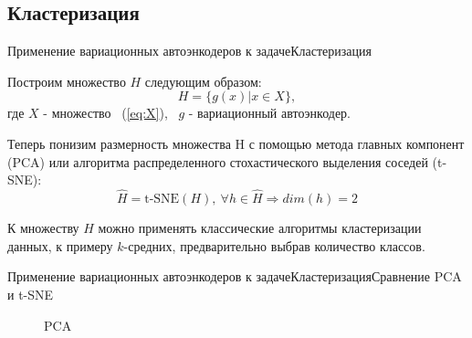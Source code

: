 \documentclass{beamer}
\begin{document}
\subsection{Кластеризация}

\begin{frame}{Применение вариационных автоэнкодеров к задаче}{Кластеризация}

Построим множество $H$ следующим образом:
\begin{equation}\label{eq:H}
H = \{g(x) | x \in X\},
\end{equation}
где $X$ - множество ~(\ref{eq:X}), ~$g$ - вариационный автоэнкодер. \par\medskip
Теперь понизим размерность множества H с помощью метода главных компонент (PCA) или алгоритма распределенного стохастического выделения соседей (t-SNE):
\begin{equation}\label{eq:hH}
\hat{H} = \text{t-SNE}(H), ~\forall h \in \hat{H} \Rightarrow dim(h) = 2
\end{equation}

К множеству $\hat{H}$ можно применять классические алгоритмы кластеризации данных, к примеру $k$-средних, предварительно выбрав количество классов.

\end{frame}

\begin{frame}{Применение вариационных автоэнкодеров к задаче}{Кластеризация}{Сравнение PCA и t-SNE}

\begin{figure}[h]{PCA}
\label{fig:images_pca}
\end{figure}

\end{frame}
\end{document}
